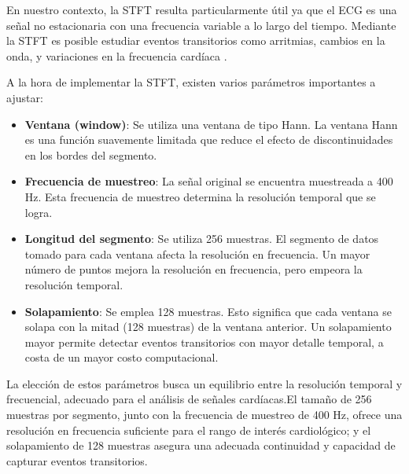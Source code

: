 En nuestro contexto, la \ac{STFT} resulta particularmente útil ya que el \ac{ECG} es una señal no estacionaria con una frecuencia variable a lo largo del tiempo. Mediante la \ac{STFT} es posible estudiar eventos transitorios como arritmias, cambios en la onda, y variaciones en la frecuencia cardíaca \citep{Clifford2006}.

A la hora de implementar la \ac{STFT}, existen varios parámetros importantes a ajustar:

\begin{itemize}
	\item \textbf{Ventana (window)}: Se utiliza una ventana de tipo Hann. La ventana Hann es una función suavemente limitada que reduce el efecto de discontinuidades en los bordes del segmento.
	
	\item \textbf{Frecuencia de muestreo}: La señal original se encuentra muestreada a 400 Hz. Esta frecuencia de muestreo determina la resolución temporal que se logra.
	
	\item \textbf{Longitud del segmento}: Se utiliza 256 muestras. El segmento de datos tomado para cada ventana afecta la resolución en frecuencia. Un mayor número de puntos mejora la resolución en frecuencia, pero empeora la resolución temporal.
	
	\item \textbf{Solapamiento}: Se emplea 128 muestras. Esto significa que cada ventana se solapa con la mitad (128 muestras) de la ventana anterior. Un solapamiento mayor permite detectar eventos transitorios con mayor detalle temporal, a costa de un mayor costo computacional.
	
\end{itemize}

La elección de estos parámetros busca un equilibrio entre la resolución temporal y frecuencial, adecuado para el análisis de señales cardíacas.El tamaño de 256 muestras por segmento, junto con la frecuencia de muestreo de 400 Hz, ofrece una resolución en frecuencia suficiente para el rango de interés cardiológico; y el solapamiento de 128 muestras asegura una adecuada continuidad y capacidad de capturar eventos transitorios.

